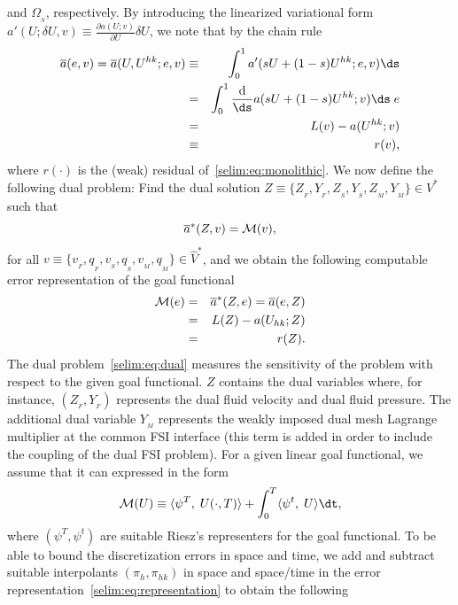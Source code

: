 and $\Omega_{_{S}}$, respectively. By introducing the linearized
variational form $a'(U; \delta U,v ) \equiv \frac{\partial
  a(U;v)}{\partial U}\delta U$, we note that by the chain rule
\begin{eqnarray}
\overline{a}(e, v) = \overline{a}(U,U^{hk};e, v) &\equiv& \int_0^1 a'(sU + (1-s)U^{hk}; e,
v) \ds \\ &=& \int_0^1 \frac{\textrm{d}}{\ds} a (sU + (1-s)U^{hk}; v) 
\ds \;e\\ &=& L(v) - a(U^{hk};v) \\ &\equiv&  r(v),
\end{eqnarray}
where $r(\cdot)$ is the (weak) residual of~\ref{selim:eq:monolithic}.
We now define the following dual problem: Find the dual solution
$Z\equiv \{ Z_{_{F}}, Y_{_{F}}, Z_{_{S}}, Y_{_{S}}, Z_{_{M}},
Y_{_{M}}\}\in V^*$ such that
\begin{equation}           
  \label{selim:eq:dual}
  \overline{a}^{*}(Z, v) = \mathcal{M}(v), 
\end{equation}
for all $v\equiv \{ v_{_{F}}, q_{_{F}}, v_{_{S}}, q_{_{S}}, v_{_{M}}, q_{_{M}}
\}\in\hat{V}^*$, and we obtain the following computable error
representation of the goal functional
\begin{eqnarray}
\label{selim:eq:representation}
\nonumber
\mathcal{M}(e) &=& \overline{a}^{*}(Z ,e) = \overline{a}(e, Z)\\ &=& L(Z) - a(
U_{hk}; Z)\\ 
\nonumber
&=& r(Z).
\end{eqnarray}
The dual problem~\eqref{selim:eq:dual} measures the sensitivity of the
problem with respect to the given goal functional.  $Z$ contains the
dual variables where, for instance, $(Z_{_{F}}, Y_{_{F}})$ represents
the dual fluid velocity and dual fluid pressure.  The additional dual
variable $Y_{_{M}}$ represents the weakly imposed dual mesh Lagrange
multiplier at the common FSI interface (this term is added in order to
include the coupling of the dual FSI problem). For a given linear
goal functional, we assume that it can expressed in the form
\begin{equation}
\M(U)  \equiv \langle \psi^T,\;  U(\cdot, T) \rangle + 
\int_0^T \langle \psi^t,\; U \rangle \dt, 
\end{equation}
where $(\psi^T, \psi^t)$ are suitable Riesz's representers for the
goal functional. To be able to bound the discretization errors in
space and time, we add and subtract suitable interpolants $(\pi_h,
\pi_{hk})$ in space and space/time in the error
representation~\eqref{selim:eq:representation} to obtain the following
